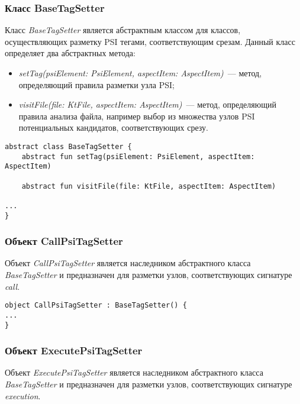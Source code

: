 \subsubsection{Класс BaseTagSetter}
\label{ssub:BaseTagSetter}
Класс \textit{BaseTagSetter} является абстрактным классом для классов, осуществляющих разметку PSI тегами, соответствующим срезам.
Данный класс определяет два абстрактных метода:
\begin{itemize}
	\item \textit{setTag(psiElement: PsiElement, aspectItem: AspectItem)}~--- метод, определяющий правила разметки узла PSI;
	\item \textit{visitFile(file: KtFile, aspectItem: AspectItem)}~--- метод, определяющий правила анализа файла, например выбор из множества узлов PSI потенциальных кандидатов, соответствующих срезу.
\end{itemize}
\begin{lstlisting}[style={java}, label={lst:BaseTagSetter},
  caption={Класс BaseTagSetter}]
abstract class BaseTagSetter {
    abstract fun setTag(psiElement: PsiElement, aspectItem: AspectItem)

    abstract fun visitFile(file: KtFile, aspectItem: AspectItem)

...
}
\end{lstlisting}
\subsubsection{Объект CallPsiTagSetter}
\label{ssub:CallPsiTagSetter}
Объект \textit{CallPsiTagSetter} является наследником абстрактного класса
\textit{BaseTagSetter} и предназначен для разметки узлов, соответствующих сигнатуре \textit{call}.

\begin{lstlisting}[style={java}, label={lst:CallPsiTagSetter},
  caption={Объект CallPsiTagSetter}]
object CallPsiTagSetter : BaseTagSetter() {
...
}
\end{lstlisting}
\subsubsection{Объект ExecutePsiTagSetter}
\label{ssub:ExecutePsiTagSetter}
Объект \textit{ExecutePsiTagSetter} является наследником абстрактного класса
\textit{BaseTagSetter} и предназначен для разметки узлов, соответствующих сигнатуре \textit{execution}.

